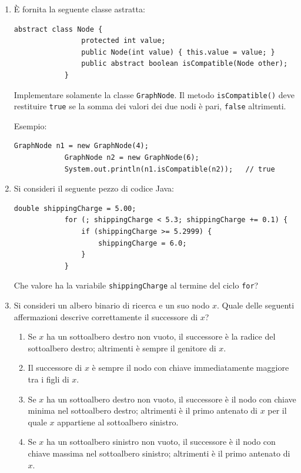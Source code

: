 	\begin{enumerate}
		
		\item È fornita la seguente classe astratta:
		\begin{lstlisting}[style=java]
			abstract class Node {
				protected int value;
				public Node(int value) { this.value = value; }
				public abstract boolean isCompatible(Node other);
			}
		\end{lstlisting}
		Implementare solamente la classe \texttt{GraphNode}. Il metodo \texttt{isCompatible()} deve restituire \texttt{true} se la somma dei valori dei due nodi è pari, \texttt{false} altrimenti.
		
		Esempio:
		\begin{lstlisting}[style=java]
			GraphNode n1 = new GraphNode(4);
			GraphNode n2 = new GraphNode(6);
			System.out.println(n1.isCompatible(n2));   // true
		\end{lstlisting}
		
		\item Si consideri il seguente pezzo di codice Java:
		\begin{lstlisting}[style=java]
			double shippingCharge = 5.00;
			for (; shippingCharge < 5.3; shippingCharge += 0.1) {
				if (shippingCharge >= 5.2999) {
					shippingCharge = 6.0;
				}
			}
		\end{lstlisting}
		Che valore ha la variabile \texttt{shippingCharge} al termine del ciclo \texttt{for}?
		
		\item Si consideri un albero binario di ricerca e un suo nodo $x$. Quale delle seguenti affermazioni descrive correttamente il successore di $x$?
		\begin{enumerate}[label=(\alph*)]
			\item Se $x$ ha un sottoalbero destro non vuoto, il successore è la radice del sottoalbero destro; altrimenti è sempre il genitore di $x$.
			\item Il successore di $x$ è sempre il nodo con chiave immediatamente maggiore tra i figli di $x$.
			\item Se $x$ ha un sottoalbero destro non vuoto, il successore è il nodo con chiave minima nel sottoalbero destro; altrimenti è il primo antenato di $x$ per il quale $x$ appartiene al sottoalbero sinistro.
			\item Se $x$ ha un sottoalbero sinistro non vuoto, il successore è il nodo con chiave massima nel sottoalbero sinistro; altrimenti è il primo antenato di $x$.
		\end{enumerate}
		

\end{enumerate}
